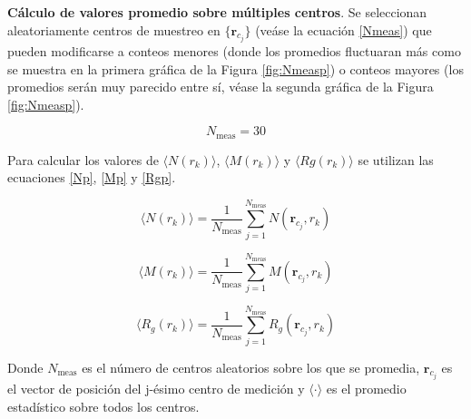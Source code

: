 	\textbf{Cálculo de valores promedio sobre múltiples centros}. Se seleccionan aleatoriamente centros de muestreo en $\{\mathbf{r}_{c_j}\}$ (veáse la ecuación \ref{Nmeas}) que pueden modificarse a conteos menores (donde los promedios fluctuaran más como se muestra en la primera gráfica de la Figura \ref{fig:Nmeasp}) o conteos mayores (los promedios serán muy parecido entre sí, véase la segunda gráfica de la Figura \ref{fig:Nmeasp}). 
	
	
	\begin{equation}
		N_{\text{meas}} = 30  
		\label{Nmeas}
	\end{equation}
	
	Para calcular los valores de $\langle N(r_k) \rangle$, $\langle M(r_k) \rangle$ y $\langle Rg(r_k) \rangle$ se utilizan las ecuaciones \ref{Np}, \ref{Mp} y \ref{Rgp}.
	
	\begin{equation}
		\langle N(r_k) \rangle = \frac{1}{N_{\text{meas}}} 
		\sum_{j=1}^{N_{\text{meas}}} N(\mathbf{r}_{c_j}, r_k)
		\label{Np}
	\end{equation}
	
	\begin{equation}
		\langle M(r_k) \rangle = \frac{1}{N_{\text{meas}}} 
		\sum_{j=1}^{N_{\text{meas}}} M(\mathbf{r}_{c_j}, r_k)
		\label{Mp}
	\end{equation}
	
	\begin{equation}
		\langle R_g(r_k) \rangle = \frac{1}{N_{\text{meas}}} 
		\sum_{j=1}^{N_{\text{meas}}} R_g(\mathbf{r}_{c_j}, r_k)
		\label{Rgp}
	\end{equation}
	
	Donde $	N_{\text{meas}}$ es el número de centros aleatorios sobre los que se promedia,
	$\mathbf{r}_{c_j}$ es el vector de posición del j-ésimo centro de medición y
	$\langle\cdot\rangle$ es el promedio estadístico sobre todos los centros.

